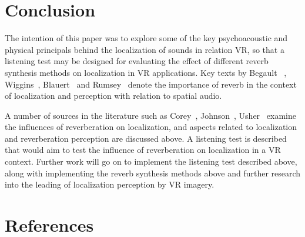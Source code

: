\documentclass[paper=a4, fontsize=10pt, font=arial]{scrartcl} %
\numberwithin{equation}{section} %
\numberwithin{figure}{section} %
\numberwithin{table}{section} %
\begin{document}
\newpage
\section{Conclusion}
The intention of this paper was to explore some of the key psychoacoustic and physical principals behind the localization of sounds in relation VR, so that a listening test may be designed for evaluating the effect of different reverb synthesis methods on localization in VR applications. Key texts by Begault~\cite{Begault1995} , Wiggins~\cite{Wiggins2004}, Blauert~\cite{Blauert1997} and Rumsey~\cite{rumsey2012spatial} denote the importance of reverb in the context of localization and perception with relation to spatial audio.

A number of sources in the literature such as Corey~\cite{Corey2002}, Johnson~\cite{Johnson2016}, Usher~\cite{Usher2005} examine the influences of reverberation on localization, and aspects related to localization and reverberation perception are discussed above. A listening test is described that would aim to test the influence of reverberation on localization in a VR context.
Further work will go on to implement the listening test described above, along with implementing the reverb synthesis methods above and further research into the leading of localization perception by VR imagery.

\newpage
\section{References}

{}

\end{document}
